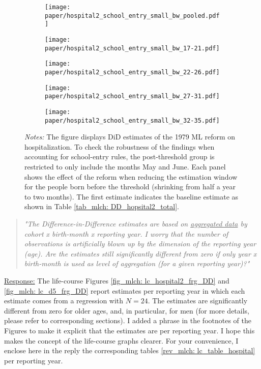 \begin{figure}[H]\centering\caption{Robustness: Account for School Cutoff Rules for Hospitalization}\label{fig_mlch: school_cutoff_hospital}
	\begin{subfigure}[h]{0.48\linewidth}\centering
		\texttt{[image: paper/hospital2\_school\_entry\_small\_bw\_pooled.pdf]}
	\end{subfigure}

	\begin{subfigure}[h]{0.48\linewidth}\centering
		\texttt{[image: paper/hospital2\_school\_entry\_small\_bw\_17-21.pdf]}
	\end{subfigure}
	\begin{subfigure}[h]{0.48\linewidth}\centering
		\texttt{[image: paper/hospital2\_school\_entry\_small\_bw\_22-26.pdf]}
	\end{subfigure}
	\begin{subfigure}[h]{0.48\linewidth}\centering
		\texttt{[image: paper/hospital2\_school\_entry\_small\_bw\_27-31.pdf]}
	\end{subfigure}
	\begin{subfigure}[h]{0.48\linewidth}\centering
		\texttt{[image: paper/hospital2\_school\_entry\_small\_bw\_32-35.pdf]}
	\end{subfigure}
		\scriptsize
	\begin{minipage}{\linewidth}
		\emph{Notes:} The figure displays DiD estimates of the 1979 ML reform on hospitalization. To check the robustness of the findings when accounting for school-entry rules, the post-threshold group is restricted to only include the months May and June. Each panel shows the effect of the reform when reducing the estimation window for the people born before the threshold (shrinking from half a year to two months). The first estimate indicates the baseline estimate as shown in Table \ref{tab_mlch: DD_hopsital2_total}.
	\end{minipage}
\end{figure}


% 
\begin{quote}
	\textit{"The Difference-in-Difference estimates are based on \underline{aggregated data} by cohort x birth-month x reporting year. I worry that the number of observations is artificially blown up by the dimension of the reporting year (age). Are the estimates still significantly different from zero if only year x birth-month is used as level of aggregation (for a given reporting year)?"}
\end{quote}
\underline{Response:} The life-course Figures \ref{fig_mlch: lc_hospital2_frg_DD} and \ref{fig_mlch: lc_d5_frg_DD} report estimates per reporting year in which each estimate comes from a regression with $N=24$. The estimates are significantly different from zero for older ages, and, in particular, for men (for more details, please refer to corresponding sections). I added a phrase in the footnotes of the Figures to make it explicit that the estimates are per reporting year. I hope this makes the concept of the life-course graphs clearer. For your convenience, I enclose here in the reply the corresponding tables \ref{rev_mlch: lc_table_hospital} per reporting year.


